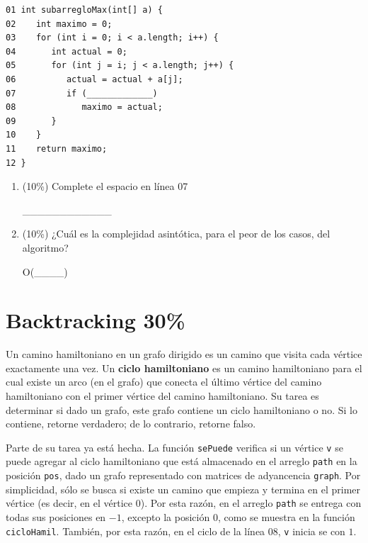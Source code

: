 \documentclass[twocolumn]{article}
\begin{document}
\begin{verbatim}
01 int subarregloMax(int[] a) {
02    int maximo = 0;
03    for (int i = 0; i < a.length; i++) {
04       int actual = 0;
05       for (int j = i; j < a.length; j++) {
06          actual = actual + a[j];
07          if (_____________)
08             maximo = actual;
09       }
10    }
11    return maximo;
12 }
\end{verbatim}



\begin{enumerate}[label=\Alph*]


    \item (10\%) Complete el espacio en línea 07


  \_\_\_\_\_\_\_\_\_\_\_\_

      \item (10\%) ¿Cuál es la complejidad asintótica, para el peor de los casos, del algoritmo?


  O(\_\_\_\_)


\end{enumerate}



\section{Backtracking 30\%}
Un camino hamiltoniano en un grafo dirigido es un camino que visita cada vértice
exactamente una vez. Un \textbf{ciclo hamiltoniano} es un camino hamiltoniano para el cual
existe un arco (en el grafo) que conecta el último vértice del camino hamiltoniano con el primer
vértice del camino hamiltoniano. Su tarea es determinar si dado un grafo, este grafo
contiene un ciclo hamiltoniano o no. Si lo contiene, retorne verdadero; de lo contrario,
retorne falso. 

Parte de su tarea ya está hecha. La función \texttt{sePuede}
verifica si un vértice \texttt{v} se puede agregar al ciclo hamiltoniano
que está almacenado en el arreglo \texttt{path} en la posición \texttt{pos},
dado un grafo representado con matrices de adyancencia \texttt{graph}.
Por simplicidad, sólo se busca si existe un camino que empieza y termina
 en el primer vértice (es decir, en el vértice $0$). Por esta razón, en el arreglo \texttt{path} se entrega con todas sus posiciones en $-1$, excepto
la posición $0$, como se muestra en la función \texttt{cicloHamil}. También, 
por esta razón, en el ciclo de la línea 08, \texttt{v} inicia se con $1$.
\end{document}
